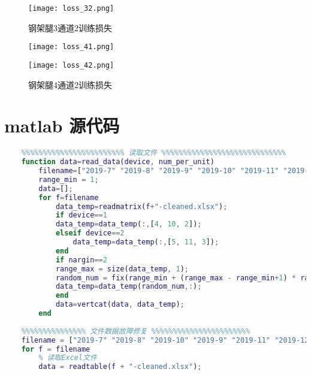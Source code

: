 \documentclass[withoutpreface,bwprint]{cumcmthesis}  %
\begin{document}
\begin{appendices}
\begin{figure}[h!]
\begin{minipage}{.48\textwidth}
                \texttt{[image: loss\_32.png]}  
                \caption{钢架腿3通道2训练损失}  
            \end{minipage}  
        \end{figure}
        \begin{figure}[h!] 
            \begin{minipage}{.48\textwidth} %
                \centering  
                \texttt{[image: loss\_41.png]}  
                \caption{钢架腿4通道1训练损失}  
            \end{minipage}  
            \hfill %
            \begin{minipage}{.48\textwidth} %
                \centering  
                \texttt{[image: loss\_42.png]}  
                \caption{钢架腿4通道2训练损失}  
                \label{loss_end}
            \end{minipage}  
        \end{figure}


        \newpage
		\section{matlab 源代码}
		
		\begin{lstlisting}[language=matlab]
    %%%%%%%%%%%%%%%%%%%%%%%%%%%%%%%%%%%%%%%%%%%%%%%%%%%%%%%%%%%%%%%
    %%%%%%%%%%%%%%%%%%%%%%%% 读取文件 %%%%%%%%%%%%%%%%%%%%%%%%%%%%%
    function data=read_data(device, num_per_unit)
        filename=["2019-7" "2019-8" "2019-9" "2019-10" "2019-11" "2019-12" "2020-2" "2020-3" "2020-4" "2020-5" "2020-6" "2020-7"];
        range_min = 1;
        data=[];
        for f=filename
            data_temp=readmatrix(f+"-cleaned.xlsx");
            if device==1
            data_temp=data_temp(:,[4, 10, 2]);
            elseif device==2
                data_temp=data_temp(:,[5, 11, 3]);
            end
            if nargin==2
            range_max = size(data_temp, 1);
            random_num = fix(range_min + (range_max - range_min+1) * rand([1, num_per_unit]));
            data_temp=data_temp(random_num,:);
            end
            data=vertcat(data, data_temp);
        end
        
    %%%%%%%%%%%%%%% 文件数据故障修复 %%%%%%%%%%%%%%%%%%%%%%%
    filename = ["2019-7" "2019-8" "2019-10" "2019-9" "2019-11" "2019-12" "2020-2" "2020-3" "2020-4" "2020-5" "2020-6" "2020-7"];
    for f = filename
        % 读取Excel文件
        data = readtable(f + "-cleaned.xlsx");
        

\end{lstlisting}
\end{appendices}
\end{document}
